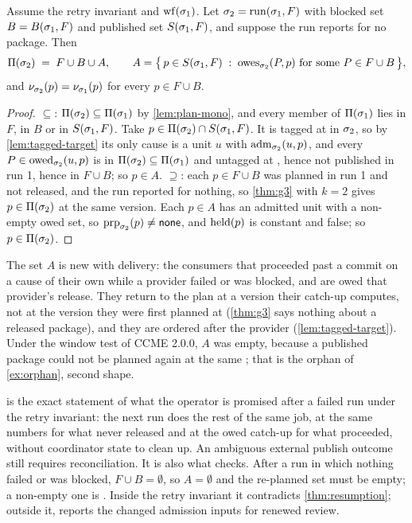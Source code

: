 \begin{theorem}
\label{thm:resumption}
Assume the retry invariant and $\mathrm{wf}(\sigma_1)$. Let $\sigma_2 = \mathrm{run}(\sigma_1,F)$
with blocked set $B = B(\sigma_1,F)$ and published set $S(\sigma_1,F)$,
and suppose the run reports  for no package. Then
\[
  \Pi(\sigma_2) \;=\; F \cup B \cup A,
  \qquad
  A = \bigl\{\, p \in S(\sigma_1,F) \;:\; \mathrm{owes}_{\sigma_2}(P,p)
      \text{ for some } P \in F \cup B \,\bigr\},
\]
and $\nu_{\sigma_2}(p) = \nu_{\sigma_1}(p)$ for every $p \in F \cup B$.
\end{theorem}

\begin{proof}
$\subseteq$: $\Pi(\sigma_2) \subseteq \Pi(\sigma_1)$ by \cref{lem:plan-mono},
and every member of $\Pi(\sigma_1)$ lies in $F$, in $B$ or in
$S(\sigma_1,F)$. Take $p \in \Pi(\sigma_2) \cap S(\sigma_1,F)$. It is
tagged at \Head{} in $\sigma_2$, so by \cref{lem:tagged-target} its only cause is
a unit $u$ with $\mathrm{adm}_{\sigma_2}(u,p)$, and every $P \in \mathrm{owed}_{\sigma_2}(u,p)$ is
in $\Pi(\sigma_2) \subseteq \Pi(\sigma_1)$ and untagged at \Head{}, hence not
published in run 1, hence in $F \cup B$; so $p \in A$.
$\supseteq$: each $p \in F \cup B$ was planned in run 1 and not released, and
the run reported  for nothing, so \cref{thm:g3} with $k = 2$ gives
$p \in \Pi(\sigma_2)$ at the same version. Each $p \in A$ has an admitted unit
with a non-empty owed set, so $\mathrm{prp}_{\sigma_2}(p) \neq \mathsf{none}$, and $\mathrm{held}(p)$
is constant and false; so $p \in \Pi(\sigma_2)$.
\end{proof}

The set $A$ is new with delivery: the consumers that proceeded past a commit
on a cause of their own while a provider failed or was blocked, and are owed
that provider's release. They return to the plan at a version their catch-up
computes, not at the version they were first planned at (\cref{thm:g3} says
nothing about a released package), and they are ordered after the provider
(\cref{lem:tagged-target}). Under the window test of CCME 2.0.0, $A$ was
empty, because a published package could not be planned again at the same
\Head{}; that is the orphan of \cref{ex:orphan}, second shape.

 is the exact statement of what the operator is promised
after a failed run under the retry invariant: the next run does the rest of
the same job, at the same numbers for what never released and at the owed
catch-up for what proceeded, without coordinator state to clean up. An
ambiguous external publish outcome still requires  reconciliation.
It is also what  checks. After a run in which nothing failed or was
blocked, $F \cup B = \emptyset$, so $A = \emptyset$ and the re-planned set must
be empty; a non-empty one is . Inside the retry invariant it
contradicts \cref{thm:resumption}; outside it,  reports the changed
admission inputs for renewed review.

